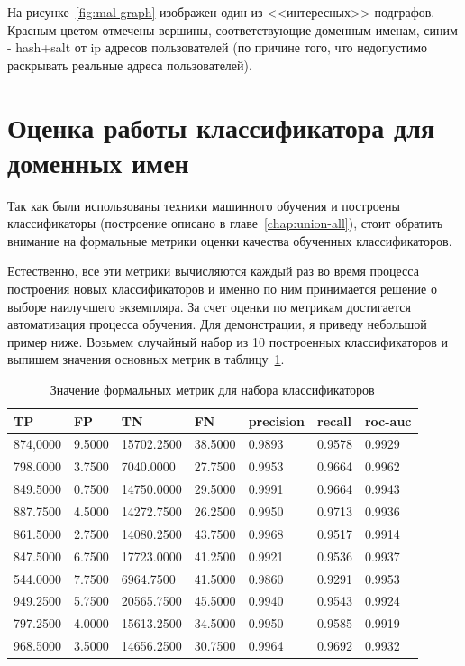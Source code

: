 \documentclass[a4paper,14pt]{extreport} %
\begin{document}
На рисунке~\ref{fig:mal-graph} изображен один из <<интересных>> подграфов. Красным цветом отмечены вершины, соответствующие доменным именам, синим - hash+salt от ip адресов пользователей (по причине того, что недопустимо раскрывать реальные адреса пользователей). 

\section{Оценка работы классификатора для доменных имен}
Так как были использованы техники машинного обучения и построены классификаторы (построение описано в главе~\ref{chap:union-all}), стоит обратить внимание на формальные метрики оценки качества обученных классификаторов.

Естественно, все эти метрики вычисляются каждый раз во время процесса построения новых классификаторов и именно по ним принимается решение о выборе наилучшего экземпляра. За счет оценки по метрикам достигается автоматизация процесса обучения. Для демонстрации, я приведу небольшой пример ниже.
\newpage
Возьмем случайный набор из 10 построенных классификаторов и выпишем значения основных метрик в таблицу~\ref{tab:metr}.

\begin{table}[H]
\caption{Значение формальных метрик для набора классификаторов}
\label{tab:metr}
	\begin{tabular}{ |l|l|l|l|l|l|l|}
		\hline
		TP       & FP     & TN         & FN      & precision & recall & roc-auc \\ \hline
		874,0000 & 9.5000 & 15702.2500 & 38.5000 & 0.9893    & 0.9578 & 0.9929  \\ \hline
		798.0000 & 3.7500 & 7040.0000  & 27.7500 & 0.9953    & 0.9664 & 0.9962  \\ \hline
		849.5000 & 0.7500 & 14750.0000 & 29.5000 & 0.9991    & 0.9664 & 0.9943  \\ \hline
		887.7500 & 4.5000 & 14272.7500 & 26.2500 & 0.9950    & 0.9713 & 0.9936  \\ \hline
		861.5000 & 2.7500 & 14080.2500 & 43.7500 & 0.9968    & 0.9517 & 0.9914  \\ \hline
		847.5000 & 6.7500 & 17723.0000 & 41.2500 & 0.9921    & 0.9536 & 0.9937  \\ \hline
		544.0000 & 7.7500 & 6964.7500  & 41.5000 & 0.9860    & 0.9291 & 0.9953  \\ \hline
		949.2500 & 5.7500 & 20565.7500 & 45.5000 & 0.9940    & 0.9543 & 0.9924  \\ \hline
		797.2500 & 4.0000 & 15613.2500 & 34.5000 & 0.9950    & 0.9585 & 0.9919  \\ \hline
		968.5000 & 3.5000 & 14656.2500 & 30.7500 & 0.9964    & 0.9692 & 0.9932  \\ \hline
	\end{tabular}
\end{table}
\end{document}
